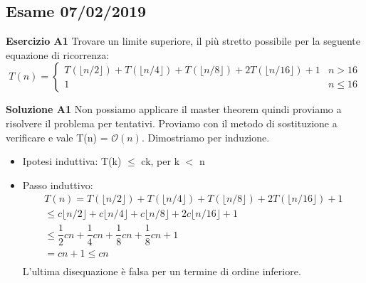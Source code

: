 \documentclass[../cheatSheetAlgoritmi.tex]{subfiles}
\begin{document}
\subsection{Esame 07/02/2019}
\textbf{Esercizio A1} Trovare un limite superiore, il più stretto possibile per la seguente equazione di ricorrenza: \
\begin{equation*}
  	T(n)=\begin{cases}
    	T(\lfloor n/2 \rfloor) + T(\lfloor n/4 \rfloor)+ T(\lfloor n/8 \rfloor)+ 2T(\lfloor n/16 \rfloor) + 1 & \text{$n > 16$}\\
    	1 & \text{$n \leq 16$}
  	\end{cases}
\end{equation*} 

\textbf{Soluzione A1} Non possiamo applicare il master theorem quindi proviamo a risolvere il problema per tentativi. Proviamo con il metodo di sostituzione a verificare e vale T(n) = $\mathcal{O}(n)$. Dimostriamo per induzione.

\begin{itemize}
	\item Ipotesi induttiva: T(k) $\leq$ ck, per k $<$ n
	\item Passo induttivo:
\begin{equation*}
\begin{aligned}	
T(n)= T(\lfloor n/2 \rfloor) + T(\lfloor n/4 \rfloor)+ T(\lfloor n/8 \rfloor)+ 2T(\lfloor n/16 \rfloor) + 1\\
\text{$\leq$} c\lfloor n/2 \rfloor + c\lfloor n/4 \rfloor+ c\lfloor n/8 \rfloor+ 2c\lfloor n/16 \rfloor + 1\\ 
\text{$\leq$}  \dfrac{1}{2}cn + \dfrac{1}{4}cn + \dfrac{1}{8}cn + \dfrac{1}{8}cn + 1\\
=  cn + 1 \text{$\leq$} cn \\
\end{aligned}
\end{equation*}
L'ultima disequazione è falsa per un termine di ordine inferiore. 
\end{itemize}
\end{document}
